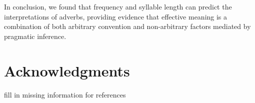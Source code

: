 \documentclass[10pt,letterpaper]{article}
\newcommand{\todo}[1]{{\color{red}#1}}
\begin{document}





In conclusion, we found that frequency and syllable length can predict the interpretations of adverbs, %
providing evidence that effective meaning is a combination of both arbitrary convention and non-arbitrary factors mediated by pragmatic inference.








\section{Acknowledgments}



\todo{fill in missing information for references}

\setlength{\bibleftmargin}{.125in}
\setlength{\bibindent}{-\bibleftmargin}


\end{document}
